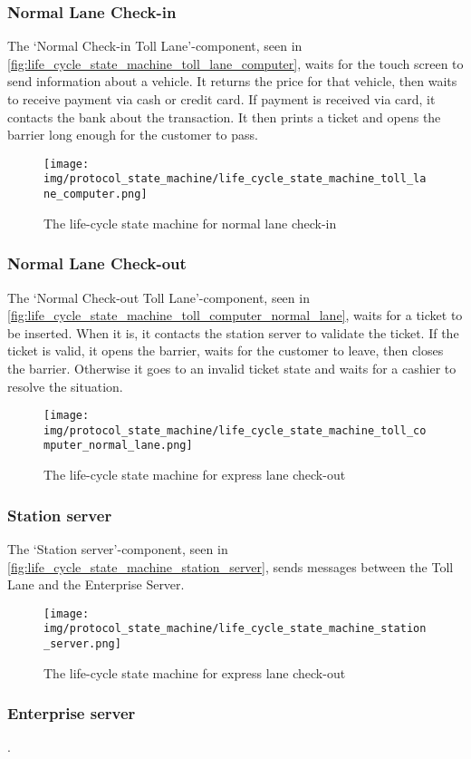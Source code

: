 \subsubsection*{Normal Lane Check-in}
The ‘Normal Check-in Toll Lane’-component, seen in \autoref{fig:life_cycle_state_machine_toll_lane_computer}, waits for the touch screen to send information about a vehicle. It returns the price for that vehicle, then waits to receive payment via cash or credit card. If payment is received via card, it contacts the bank about the transaction. It then prints a ticket and opens the barrier long enough for the customer to pass.
\begin{figure}
\centering
\texttt{[image: img/protocol\_state\_machine/life\_cycle\_state\_machine\_toll\_lane\_computer.png]}
\caption{The life-cycle state machine for normal lane check-in}
\label{fig:life_cycle_state_machine_toll_lane_computer}
\end{figure}

\subsubsection*{Normal Lane Check-out}
The ‘Normal Check-out Toll Lane’-component, seen in \autoref{fig:life_cycle_state_machine_toll_computer_normal_lane}, waits for a ticket to be inserted. When it is, it contacts the station server to validate the ticket. If the ticket is valid, it opens the barrier, waits for the customer to leave, then closes the barrier. Otherwise it goes to an invalid ticket state and waits for a cashier to resolve the situation.
\begin{figure}
\centering
\texttt{[image: img/protocol\_state\_machine/life\_cycle\_state\_machine\_toll\_computer\_normal\_lane.png]}
\caption{The life-cycle state machine for express lane check-out}
\label{fig:life_cycle_state_machine_toll_computer_normal_lane}
\end{figure}

\subsubsection*{Station server}
The ‘Station server’-component, seen in \autoref{fig:life_cycle_state_machine_station_server}, sends messages between the Toll Lane and the Enterprise Server.
\begin{figure}
\centering
\texttt{[image: img/protocol\_state\_machine/life\_cycle\_state\_machine\_station\_server.png]}
\caption{The life-cycle state machine for express lane check-out}
\label{fig:life_cycle_state_machine_station_server}
\end{figure}


\subsubsection*{Enterprise server}
.